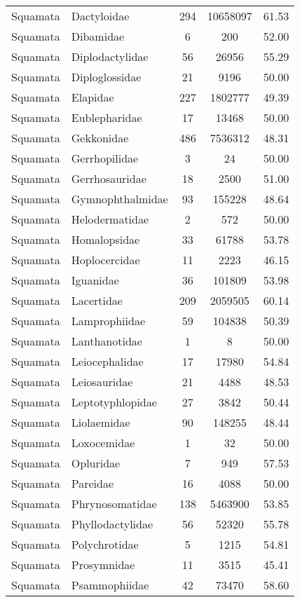 \begin{longtable}{llccc}
  Squamata & Dactyloidae & 294 & 10658097 & 61.53 \\ 
  Squamata & Dibamidae &   6 & 200 & 52.00 \\ 
  Squamata & Diplodactylidae &  56 & 26956 & 55.29 \\ 
  Squamata & Diploglossidae &  21 & 9196 & 50.00 \\ 
  Squamata & Elapidae & 227 & 1802777 & 49.39 \\ 
  Squamata & Eublepharidae &  17 & 13468 & 50.00 \\ 
  Squamata & Gekkonidae & 486 & 7536312 & 48.31 \\ 
  Squamata & Gerrhopilidae &   3 &  24 & 50.00 \\ 
  Squamata & Gerrhosauridae &  18 & 2500 & 51.00 \\ 
  Squamata & Gymnophthalmidae &  93 & 155228 & 48.64 \\ 
  Squamata & Helodermatidae &   2 & 572 & 50.00 \\ 
  Squamata & Homalopsidae &  33 & 61788 & 53.78 \\ 
  Squamata & Hoplocercidae &  11 & 2223 & 46.15 \\ 
  Squamata & Iguanidae &  36 & 101809 & 53.98 \\ 
  Squamata & Lacertidae & 209 & 2059505 & 60.14 \\ 
  Squamata & Lamprophiidae &  59 & 104838 & 50.39 \\ 
  Squamata & Lanthanotidae &   1 &   8 & 50.00 \\ 
  Squamata & Leiocephalidae &  17 & 17980 & 54.84 \\ 
  Squamata & Leiosauridae &  21 & 4488 & 48.53 \\ 
  Squamata & Leptotyphlopidae &  27 & 3842 & 50.44 \\ 
  Squamata & Liolaemidae &  90 & 148255 & 48.44 \\ 
  Squamata & Loxocemidae &   1 &  32 & 50.00 \\ 
  Squamata & Opluridae &   7 & 949 & 57.53 \\ 
  Squamata & Pareidae &  16 & 4088 & 50.00 \\ 
  Squamata & Phrynosomatidae & 138 & 5463900 & 53.85 \\ 
  Squamata & Phyllodactylidae &  56 & 52320 & 55.78 \\ 
  Squamata & Polychrotidae &   5 & 1215 & 54.81 \\ 
  Squamata & Prosymnidae &  11 & 3515 & 45.41 \\ 
  Squamata & Psammophiidae &  42 & 73470 & 58.60 \\ 

\end{longtable}
